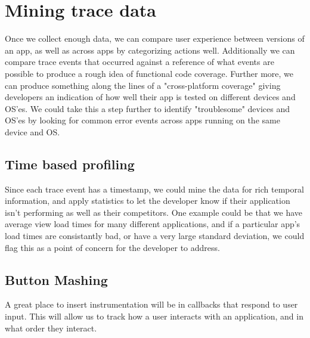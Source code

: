 \section{Mining trace data}
\label{section:datamining}
Once we collect enough data, we can compare user experience between versions
of an app, as well as across apps by categorizing actions well. Additionally
we can compare trace events that occurred against a reference of what events
are possible to produce a rough idea of functional code coverage. Further
more, we can produce something along the lines of a "cross-platform coverage"
giving developers an indication of how well their app is tested on different
devices and OS'es. We could take this a step further to identify "troublesome"
devices and OS'es by looking for common error events across apps running on the
same device and OS.

\subsection{Time based profiling}
Since each trace event has a timestamp, we could mine the data for rich
temporal information, and apply statistics to let the developer know if their application
isn't performing as well as their competitors. One example could be that we have average 
view load times for many different applications, and if a particular app's load times
are consistantly bad, or have a very large standard deviation, we could flag this as a
point of concern for the developer to address.

\subsection{Button Mashing}
A great place to insert instrumentation will be in callbacks that respond to user input.
This will allow us to track how a user interacts with an application, and in what order
they interact.
